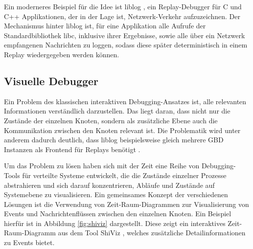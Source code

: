 \documentclass[12pt,a4paper]{report}
\begin{document}
Ein moderneres Beispiel für die Idee ist liblog \cite{distributed_replay_debugging_2006}, ein Replay-Debugger für C und
C++ Applikationen, der in der Lage ist, Netzwerk-Verkehr aufzuzeichnen. Der Mechanismus hinter liblog ist, für eine
Applikation alle Aufrufe der Standardbibliothek libc, inklusive ihrer Ergebnisse, sowie alle über ein Netzwerk empfangenen
Nachrichten zu loggen, sodass diese später deterministisch in einem Replay wiedergegeben werden können.

\subsection{Visuelle Debugger}
Ein Problem des klassischen interaktiven Debugging-Ansatzes ist, alle relevanten Informationen verständlich darzustellen. Das
liegt daran, dass nicht nur die Zustände der einzelnen Knoten, sondern als zusätzliche Ebene auch die Kommunikation
zwischen den Knoten relevant ist. Die Problematik wird unter anderem dadurch deutlich, dass liblog beispielsweise gleich mehrere
GBD Instanzen als Frontend für Replays benötigt \cite{distributed_replay_debugging_2006}.

Um das Problem zu lösen haben sich mit der Zeit eine Reihe von Debugging-Tools für verteilte Systeme entwickelt, die die Zustände
einzelner Prozesse abstrahieren und sich darauf konzentrieren, Abläufe und Zustände auf Systemebene zu visualisieren. Ein
gemeinsames Konzept der verschiedenen Lösungen ist die Verwendung von Zeit-Raum-Diagrammen zur Visualisierung von Events und
Nachrichtenflüssen zwischen den einzelnen Knoten. Ein Beispiel hierfür ist in Abbildung \ref{fig:shiviz} dargestellt. Diese zeigt
ein interaktives Zeit-Raum-Diagramm aus dem Tool ShiViz \cite{ShiViz_visual_debugger}, welches zusätzliche Detailinformationen zu
Events bietet.
\end{document}
